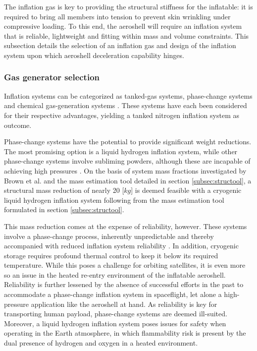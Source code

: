 The inflation gas is key to providing the structural stiffness for the inflatable: it is required to bring all members into tension to prevent skin wrinkling under compressive loading. To this end, the aeroshell will require an inflation system that is reliable, lightweight and fitting within mass and volume constraints. This subsection details the selection of an inflation gas and design of the inflation system upon which aeroshell deceleration capability hinges.

\subsubsection{Gas generator selection}
Inflation systems can be categorized as tanked-gas systems, phase-change systems and chemical gas-generation systems \cite{Jenkins2001}. These systems have each been considered for their respective advantages, yielding a tanked nitrogen inflation system as outcome. 

Phase-change systems have the potential to provide significant weight reductions. The most promising option is a liquid hydrogen inflation system, while other phase-change systems involve subliming powders, although these are incapable of achieving high pressures \cite{Freeland1998}.  On the basis of system mass fractions investigated by Brown et al. \cite{Brown2009} and the mass estimation tool detailed in section \ref{subsec:structool}, a structural mass reduction of nearly 20 [$kg$] is deemed feasible with a cryogenic liquid hydrogen inflation system following from the mass estimation tool formulated in section \ref{subsec:structool}. 

This mass reduction comes at the expense of reliability, however. These systems involve a phase-change process, inherently unpredictable and thereby accompanied with reduced inflation system reliability \cite{Jenkins2001}. In addition, cryogenic storage requires profound thermal control to keep it below its required temperature. While this poses a challenge for orbiting satellites, it is even more so an issue in the heated re-entry environment of the inflatable aeroshell. Reliability is further lessened by the absence of successful efforts in the past to accommodate a phase-change inflation system in spaceflight, let alone a high-pressure application like the aeroshell at hand. As reliability is key for transporting human payload, phase-change systems are deemed ill-suited. Moreover, a liquid hydrogen inflation system poses issues for safety when operating in the Earth atmosphere, in which flammability risk is present by the dual presence of hydrogen and oxygen in a heated environment.

